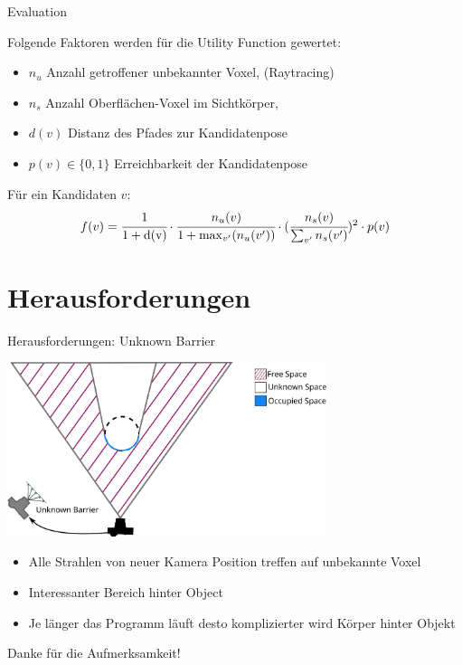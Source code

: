 \documentclass{beamer}
\begin{document}
\begin{frame}{Evaluation}
	\begin{block}{}
		Folgende Faktoren werden für die Utility Function gewertet:
		\begin{itemize}
			\item $n_{u}$ Anzahl getroffener unbekannter Voxel, (Raytracing)
			\item $n_s$ Anzahl Oberflächen-Voxel im Sichtkörper,
			\item $d(v)$ Distanz des Pfades zur Kandidatenpose
			\item $p(v) \in \{0,1\}$ Erreichbarkeit der Kandidatenpose
		\end{itemize}
		Für ein Kandidaten $v$:
		\[f(v) = \cfrac{1}{1 + \text{d(v)}} \cdot \cfrac{n_{u}(v)}{1 + \max_{v'}(n_{u}(v'))} \cdot (\cfrac{n_s(v)}{\sum_{v'}n_s(v')})^2 \cdot p(v)\]
	\end{block}
\end{frame}
\section{Herausforderungen}
\begin{frame}{Herausforderungen: Unknown Barrier}
	\begin{block}{}
		\begin{center}
			\includegraphics[width=0.7\textwidth]{Graphics/unknown_barrier_v2.png}
		\end{center}
		\begin{itemize}
			\item Alle Strahlen von neuer Kamera Position treffen auf unbekannte Voxel
			\item Interessanter Bereich hinter Object
			\item Je länger das Programm läuft desto komplizierter wird Körper hinter Objekt
		\end{itemize}
	\end{block}
\end{frame}

\begin{frame}{}
	\centering
	\Large{Danke für die Aufmerksamkeit!}
\end{frame}

\printbibliography
\end{document}
